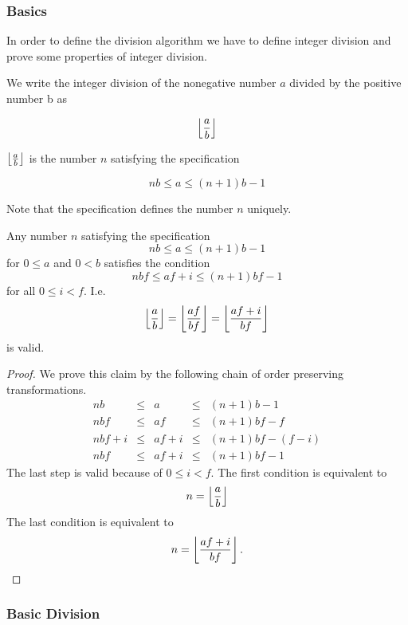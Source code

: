 \subsubsection{Basics}

In order to define the division algorithm we have to define integer division and
prove some properties of integer division.

\begin{definition}

    We write the integer division of the nonegative number $a$
    divided by the positive number {b} as

    $$\left\lfloor \frac{a}{b} \right\rfloor$$

    \noindent $\left\lfloor \frac{a}{b} \right\rfloor$ is the number $n$ satisfying the specification

    $$
    nb \le a \le (n+1) b - 1
    $$

    Note that the specification defines the number $n$ uniquely.
\end{definition}

\begin{theorem}\label{intdiv-theorem}
    Any number $n$ satisfying the specification
    $$n b \le a \le (n+1) b - 1$$
    for $0 \le a$ and $0 < b$ satisfies the condition
    $$ n b f \le a f + i \le (n+1) b f - 1 $$
    for all $0 \le i < f$. I.e.
    $$
    \left\lfloor \frac{a}{b} \right\rfloor = \left\lfloor \frac{af}{bf} \right\rfloor = \left\lfloor \frac{af + i}{bf} \right\rfloor
    $$
    is valid.

    \begin{proof}
        We prove this claim by the following chain of order preserving
        transformations.
        $$
        \begin{array}{lllll}
            n b &\le& a &\le& (n+1) b - 1
            \\
            nbf &\le& af &\le& (n+1) b f - f
            \\
            nbf + i &\le& af + i &\le& (n+1) b f - (f - i)
            \\
            nbf     &\le& af + i &\le& (n+1) b f - 1
        \end{array}
        $$
        The last step is valid because of $0 \le i < f$. The first condition is
        equivalent to
        $$ n = \left\lfloor \frac{a}{b} \right\rfloor$$
        The last condition is equivalent to
        $$ n = \left\lfloor \frac{af + i}{bf} \right\rfloor.$$
    \end{proof}
\end{theorem}


\subsubsection{Basic Division}

